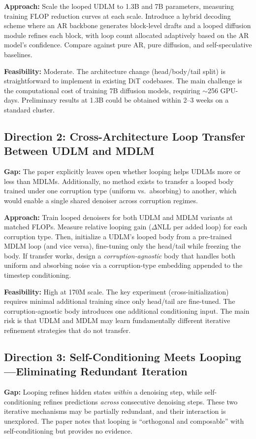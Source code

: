 \documentclass[11pt,a4paper]{article}
\begin{document}
\textbf{Approach:} Scale the looped UDLM to 1.3B and 7B parameters, measuring training FLOP reduction curves at each scale. Introduce a hybrid decoding scheme where an AR backbone generates block-level drafts and a looped diffusion module refines each block, with loop count allocated adaptively based on the AR model's confidence. Compare against pure AR, pure diffusion, and self-speculative baselines.

\textbf{Feasibility:} Moderate. The architecture change (head/body/tail split) is straightforward to implement in existing DiT codebases. The main challenge is the computational cost of training 7B diffusion models, requiring $\sim$256 GPU-days. Preliminary results at 1.3B could be obtained within 2--3 weeks on a standard cluster.

\subsection{Direction 2: Cross-Architecture Loop Transfer Between UDLM and MDLM}
\textbf{Gap:} The paper explicitly leaves open whether looping helps UDLMs more or less than MDLMs. Additionally, no method exists to transfer a looped body trained under one corruption type (uniform vs.\ absorbing) to another, which would enable a single shared denoiser across corruption regimes.

\textbf{Approach:} Train looped denoisers for both UDLM and MDLM variants at matched FLOPs. Measure relative looping gain ($\Delta$NLL per added loop) for each corruption type. Then, initialize a UDLM's looped body from a pre-trained MDLM loop (and vice versa), fine-tuning only the head/tail while freezing the body. If transfer works, design a \emph{corruption-agnostic} body that handles both uniform and absorbing noise via a corruption-type embedding appended to the timestep conditioning.

\textbf{Feasibility:} High at 170M scale. The key experiment (cross-initialization) requires minimal additional training since only head/tail are fine-tuned. The corruption-agnostic body introduces one additional conditioning input. The main risk is that UDLM and MDLM may learn fundamentally different iterative refinement strategies that do not transfer.

\subsection{Direction 3: Self-Conditioning Meets Looping---Eliminating Redundant Iteration}
\textbf{Gap:} Looping refines hidden states \emph{within} a denoising step, while self-conditioning refines predictions \emph{across} consecutive denoising steps. These two iterative mechanisms may be partially redundant, and their interaction is unexplored. The paper notes that looping is ``orthogonal and composable'' with self-conditioning but provides no evidence.
\end{document}
